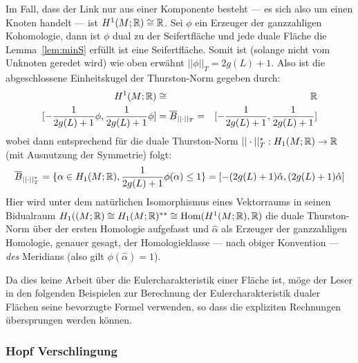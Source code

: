         Im Fall, dass der Link nur aus einer Komponente besteht --- es sich also um einen Knoten handelt --- ist $H^1(M;\mathbb{R})\cong \mathbb{R}$. Sei $\phi$ ein Erzeuger der ganzzahligen Kohomologie, dann ist $\phi$ dual zu der Seifertfläche und jede duale Fläche die Lemma~\ref{lem:minS} erfüllt ist eine Seifertfläche. Somit ist (solange nicht vom Unknoten geredet wird) wie oben erwähnt $||\phi||_T=2g(L)+1$. Also ist die abgeschlossene Einheitskugel der Thurston-Norm gegeben durch:
        \begin{eqnarray*}
            H^1(M;\mathbb{R}) &\cong & \mathbb{R} \\
            {[- \frac{1}{2g(L)+1} \phi,\frac 1 {2g(L)+1} \phi]} & = \overline B_{||\cdot||_T}=& {[- \frac 1 {2g(L)+1}, \frac 1 {2g(L)+1}]}
        \end{eqnarray*}
        wobei dann entsprechend für die duale Thurston-Norm $||\cdot||_T^* : H_1(M;\mathbb{R})\to \mathbb{R}$ (mit Ausnutzung der Symmetrie) folgt:
        \[
            \overline B_{||\cdot||_T^*} = \{\alpha \in H_1(M;\mathbb{R}), \frac{1}{2g(L)+1}\phi (\alpha)\leq 1\} = {[-(2g(L)+1)\hat \alpha, (2g(L)+1) \hat \alpha]}
        \]
        Hier wird unter dem natürlichen Isomorphismus eines Vektorraums in seinen Bidualraum $H_1((M;\mathbb{R}) \cong H_1(M;\mathbb{R})^{**} \cong \operatorname{Hom}(H^1(M;\mathbb{R}),\mathbb{R})$ die duale Thurston-Norm über der ersten Homologie aufgefasst und $\hat \alpha$ als Erzeuger der ganzzahligen Homologie, genauer gesagt, der Homologieklasse --- nach obiger Konvention --- \emph{des} Meridians (also gilt $\phi(\hat \alpha)=1$). 
        \begin{bem}
            Da dies keine Arbeit über die Eulercharakteristik einer Fläche ist, möge der Leser in den folgenden Beispielen zur Berechnung der Eulercharakteristik dualer Flächen seine bevorzugte Formel verwenden, so dass die expliziten Rechnungen übersprungen werden können.
        \end{bem}
        \subsubsection*{Hopf Verschlingung}


